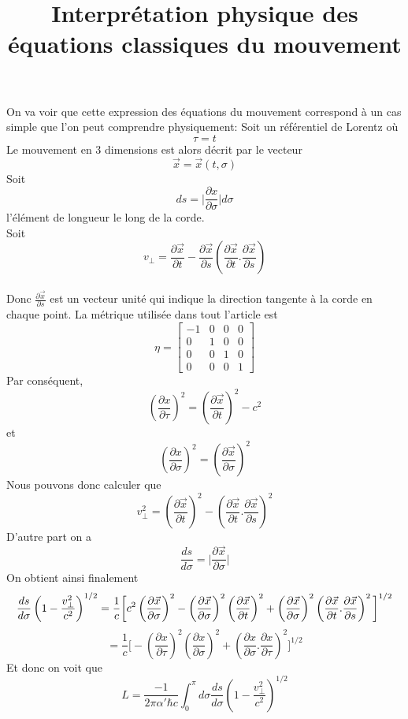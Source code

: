 \documentclass[a4paper,12pt]{article}
\title{Interprétation physique des équations classiques du mouvement}
\begin{document}
\maketitle

On va voir que cette expression des équations du mouvement correspond à un cas simple que l'on peut comprendre physiquement: 
Soit un référentiel de Lorentz où $$\tau=t$$
Le mouvement en 3 dimensions est alors décrit par le vecteur 
$$\vec{x}=\vec{x}(t,\sigma)$$
Soit $$ds=\vert\frac{\partial x}{\partial \sigma}\vert d\sigma$$ l'élément de longueur le long de la corde.\\
Soit $$v_{\perp}=\frac{\partial \vec{x}}{\partial t}-\frac{\partial \vec{x}}{\partial s}\left(\frac{\partial \vec{x}}{\partial t}.\frac{\partial \vec{x}}{\partial s}\right)$$\\
Donc $\frac{\partial \vec{x}}{\partial s}$ est un vecteur unité qui indique la direction tangente à la corde en chaque point. 
La métrique utilisée dans tout l'article est
$$
\eta=
\begin{bmatrix}
    -1 & 0 & 0 & 0\\
    0  & 1 & 0 & 0\\
    0  & 0 & 1 & 0\\
    0  & 0 & 0 & 1
\end{bmatrix}
$$
Par conséquent, $$\left(\frac{\partial x}{\partial \tau}\right)^2= \left(\frac{\partial \vec{x}}{\partial t}\right)^2-c^2$$et$$\left(\frac{\partial x}{\partial \sigma}\right)^2= \left(\frac{\partial \vec{x}}{\partial \sigma}\right)^2$$
Nous pouvons donc calculer que $$v_{\perp}^2=\left(\frac{\partial \vec{x}}{\partial t}\right)^2- \left(\frac{\partial \vec{x}}{\partial t}.\frac{\partial \vec{x}}{\partial s}\right)^2$$
D'autre part on a
$$\frac{ds}{d\sigma}=\vert\frac{\partial \vec{x}}{\partial \sigma}\vert$$
On obtient ainsi finalement
\begin{equation}
\frac{ds}{d\sigma}\left(1-\frac{v_{\perp}^2}{c^2}\right)^{1/2}=\frac{1}{c}\bigg[c^2\left(\frac{\partial \vec{x}}{\partial \sigma}\right)^2-\left(\frac{\partial \vec{x}}{\partial \sigma}\right)^2\left(\frac{\partial \vec{x}}{\partial t}\right)^2+\left(\frac{\partial \vec{x}}{\partial \sigma}\right)^2\left(\frac{\partial \vec{x}}{\partial t}.\frac{\partial \vec{x}}{\partial s}\right)^2\bigg]^{1/2}\\
\end{equation}
\begin{equation}
=\frac{1}{c}\bigg[-\left(\frac{\partial x}{\partial\tau}\right)^2\left(\frac{\partial x}{\partial\sigma}\right)^2+\left(\frac{\partial x}{\partial\sigma}.\frac{\partial x}{\partial\tau}\right)^2\bigg]^{1/2}
\end{equation}
Et donc on voit que
\begin{equation}
L=\frac{-1}{2\pi\alpha'\hbar c}\int_{0}^{\pi}d\sigma\frac{ds}{d\sigma}\left(1-\frac{v_{\perp}^2}{c^2}\right)^{1/2}
\end{equation}
\end{document}
